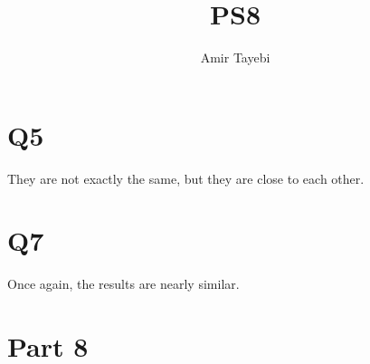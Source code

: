 \documentclass{article}
\title{PS8}
\author{Amir Tayebi}
\begin{document}
\maketitle

\section{Q5}
They are not exactly the same, but they are close to each other.

\section{Q7}
Once again,  the results are nearly similar.  
\section{Part 8}
\end{document}
